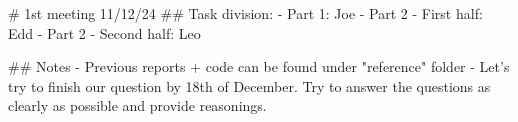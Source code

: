 \documentclass{article}
\begin{document}
\begin{markdown}
# 1st meeting 11/12/24
## Task division:
- Part 1: Joe
- Part 2 - First half: Edd
- Part 2 - Second half: Leo

## Notes
- Previous reports + code can be found under "reference" folder
- Let's try to finish our question by 18th of December. Try to answer the questions as clearly as possible and provide reasonings.

\end{markdown}
\end{document}
